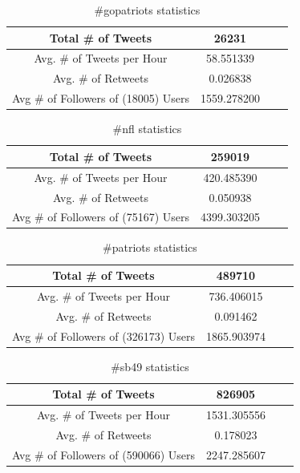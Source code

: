 \documentclass[12pt]{article}
\begin{document}
\begin{table}[h]
	\centering
	\begin{tabular}{| c | c | c | c |}
		\hline 
		Total \# of Tweets & 26231 \\\hline
		Avg. \# of Tweets per Hour & 58.551339 \\\hline
		Avg. \# of Retweets & 0.026838 \\\hline
		Avg \# of Followers of (18005) Users & 1559.278200 \\\hline
	\end{tabular} 
	\caption{\#gopatriots statistics}
	\label{part1:tab1}
\end{table} 

\begin{table}[h]
	\centering
	\begin{tabular}{| c | c | c | c |}
		\hline 
		Total \# of Tweets & 259019 \\\hline
		Avg. \# of Tweets per Hour & 420.485390 \\\hline
		Avg. \# of Retweets & 0.050938 \\\hline
		Avg \# of Followers of (75167) Users & 4399.303205 \\\hline
	\end{tabular} 
	\caption{\#nfl statistics}
	\label{part1:tab1}
\end{table} 

\begin{table}[h]
	\centering
	\begin{tabular}{| c | c | c | c |}
		\hline 
		Total \# of Tweets & 489710 \\\hline
		Avg. \# of Tweets per Hour & 736.406015 \\\hline
		Avg. \# of Retweets & 0.091462 \\\hline
		Avg \# of Followers of (326173) Users & 1865.903974 \\\hline
	\end{tabular} 
	\caption{\#patriots statistics}
	\label{part1:tab1}
\end{table} 

\begin{table}[h]
	\centering
	\begin{tabular}{| c | c | c | c |}
		\hline 
		Total \# of Tweets & 826905 \\\hline
		Avg. \# of Tweets per Hour & 1531.305556 \\\hline
		Avg. \# of Retweets & 0.178023 \\\hline
		Avg \# of Followers of (590066) Users & 2247.285607 \\\hline
	\end{tabular} 
	\caption{\#sb49 statistics}
	\label{part1:tab1}
\end{table} 
\end{document}
